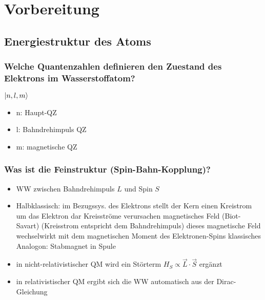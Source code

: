 \section{Vorbereitung}
\label{sec:vorbereitung}
\subsection{Energiestruktur des Atoms}

\subsubsection{Welche Quantenzahlen definieren den Zuestand des Elektrons im Wasserstoffatom?}
$\lvert {n,l,m} \rangle$
\begin{itemize}
    \item n: Haupt-QZ
    \item l: Bahndrehimpuls QZ
    \item m: magnetische QZ
\end{itemize}

\subsubsection{Was ist die Feinstruktur (Spin-Bahn-Kopplung)?}
\begin{itemize}
    \item WW zwischen Bahndrehimpuls $L$ und Spin $S$
    \item Halbklassisch: 
        \to im Bezugssys. des Elektrons stellt der Kern einen Kreistrom um das Elektron dar
        \to Kreisströme verursachen magnetisches Feld (Biot-Savart) (Kreisstrom entspricht dem Bahndrehimpuls)
        \to dieses magnetische Feld wechselwirkt mit dem magnetischen Moment des Elektronen-Spins
        \to klassisches Analogon: Stabmagnet in Spule
    \item in nicht-relativistischer QM wird ein Störterm $H_S\propto\vec{L}\cdot\vec{S}$ ergänzt
    \item in relativistischer QM ergibt sich die WW automatisch aus der Dirac-Gleichung
\end{itemize}

